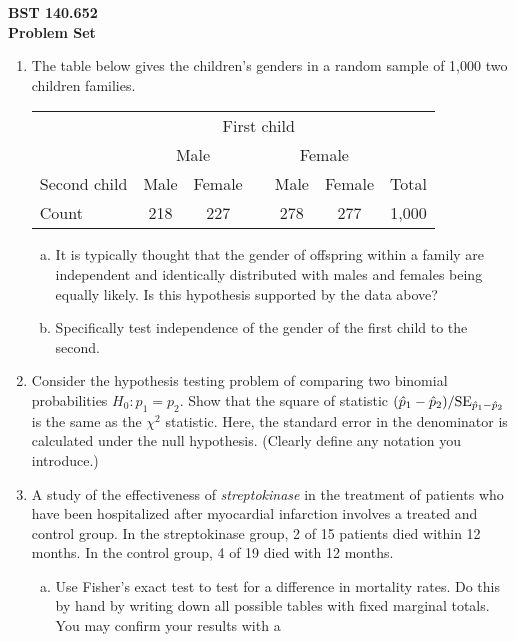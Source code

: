 \documentclass[12pt]{article}
\begin{document}
\noindent
{\bf BST 140.652 \\ Problem Set} \\

\begin{enumerate}[Problem 1.]
\item The table below gives the children's genders in a random sample
  of 1,000 two children families.
  \begin{center}
    \begin{tabular}{lcccccc}
             & \multicolumn{5}{c}{First child}  \\
             & \multicolumn{2}{c}{Male} && \multicolumn{2}{c}{Female} & \\ \cline{2-3} \cline{5-6}
Second child & Male & Female && Male & Female & Total \\ \hline
Count        &  218 & 227    && 278  & 277    & 1,000 \\ \hline
    \end{tabular}
  \end{center}
  \begin{enumerate}[a.]
  \item It is typically thought that the gender of offspring within a
    family are independent and identically distributed with males and
    females being equally likely.  Is this hypothesis supported by the
    data above?
  \item Specifically test independence of the gender of the first child to the second.
  \end{enumerate}
\item Consider the hypothesis testing problem of comparing two
  binomial probabilities $H_0: p_1 = p_2$.  Show that the square of
  statistic $(\hat{p}_1 - \hat{p}_2)/{\rm SE}_{\hat{p}_1 - \hat{p}_2}$
  is the same as the $\chi^2$ statistic. Here, the standard error in
  the denominator is calculated under the null hypothesis. (Clearly
  define any notation you introduce.)
\item A study of the effectiveness of {\sl streptokinase} in the
  treatment of patients who have been hospitalized after myocardial
  infarction involves a treated and control group.  In the
  streptokinase group, 2 of 15 patients died within 12 months.  In the
  control group, 4 of 19 died with 12 months.
  \begin{enumerate}[a.]
  \item Use Fisher's exact test to test for a difference in mortality
    rates.  Do this by hand by writing down all possible tables with
    fixed marginal totals.  You may confirm your results with a

\end{enumerate}
\end{enumerate}
\end{document}
